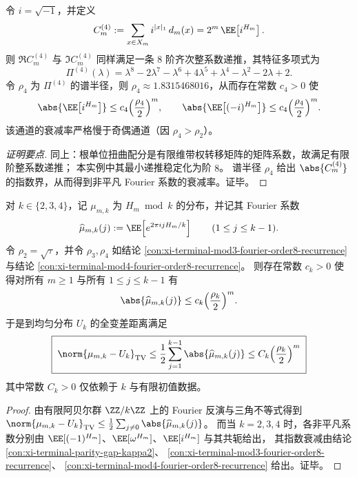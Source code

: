 \begin{conclusion}\label{con:xi-terminal-mod4-fourier-order8-recurrence}
令 \(i=\sqrt{-1}\)，并定义
\[
C_m^{(4)}:=\sum_{x\in X_m} i^{|x|_1}\,d_m(x)
=2^m\,\EE\!\left[i^{H_m}\right].
\]
则 \(\Re C_m^{(4)}\) 与 \(\Im C_m^{(4)}\) 同样满足一条 \(8\) 阶齐次整系数递推，其特征多项式为
\[
\Pi^{(4)}(\lambda)=\lambda^8-2\lambda^7-\lambda^6+4\lambda^5+\lambda^4-\lambda^2-2\lambda+2.
\]
令 \(\rho_4\) 为 \(\Pi^{(4)}\) 的谱半径，则 \(\rho_4\approx 1.8315468016\)，从而存在常数 \(c_4>0\) 使
\[
\abs{\EE\!\left[i^{H_m}\right]}\le c_4\Bigl(\frac{\rho_4}{2}\Bigr)^m,
\qquad
\abs{\EE\!\left[(-i)^{H_m}\right]}\le c_4\Bigl(\frac{\rho_4}{2}\Bigr)^m.
\]
该通道的衰减率严格慢于奇偶通道（因 \(\rho_4>\rho_2\)）。
\end{conclusion}
\begin{proof}[证明要点]
同上：根单位扭曲配分是有限维带权转移矩阵的矩阵系数，故满足有限阶整系数递推；
本实例中其最小递推稳定化为阶 \(8\)。
谱半径 \(\rho_4\) 给出 \(\abs{C_m^{(4)}}\) 的指数界，从而得到非平凡 Fourier 系数的衰减率。证毕。
\end{proof}

\begin{conclusion}\label{con:xi-terminal-congruence-mixing-tv-bound}
对 \(k\in\{2,3,4\}\)，记 \(\mu_{m,k}\) 为 \(H_m\bmod k\) 的分布，并记其 Fourier 系数
\[
\widehat{\mu}_{m,k}(j):=\EE\!\left[e^{2\pi i j H_m/k}\right]\qquad(1\le j\le k-1).
\]
令 \(\rho_2=\sqrt{\tau}\)，并令 \(\rho_3,\rho_4\) 如结论 \ref{con:xi-terminal-mod3-fourier-order8-recurrence} 与结论 \ref{con:xi-terminal-mod4-fourier-order8-recurrence}。
则存在常数 \(c_k>0\) 使得对所有 \(m\ge 1\) 与所有 \(1\le j\le k-1\) 有
\[
\abs{\widehat{\mu}_{m,k}(j)}\le c_k\Bigl(\frac{\rho_k}{2}\Bigr)^m.
\]
于是到均匀分布 \(U_k\) 的全变差距离满足
\[
\boxed{\;
\norm{\mu_{m,k}-U_k}_{\mathrm{TV}}
\le \frac12\sum_{j=1}^{k-1}\abs{\widehat{\mu}_{m,k}(j)}
\le C_k\Bigl(\frac{\rho_k}{2}\Bigr)^m\;}
\]
其中常数 \(C_k>0\) 仅依赖于 \(k\) 与有限初值数据。
\end{conclusion}
\begin{proof}
由有限阿贝尔群 \(\ZZ/k\ZZ\) 上的 Fourier 反演与三角不等式得到
\(
\norm{\mu_{m,k}-U_k}_{\mathrm{TV}}\le \frac12\sum_{j\ne 0}\abs{\widehat{\mu}_{m,k}(j)}
\)。
而当 \(k=2,3,4\) 时，各非平凡系数分别由
\(\EE[(-1)^{H_m}]\)、\(\EE[\omega^{H_m}]\)、\(\EE[i^{H_m}]\) 与其共轭给出，
其指数衰减由结论 \ref{con:xi-terminal-parity-gap-kappa2}、
\ref{con:xi-terminal-mod3-fourier-order8-recurrence}、
\ref{con:xi-terminal-mod4-fourier-order8-recurrence} 给出。证毕。
\end{proof}

